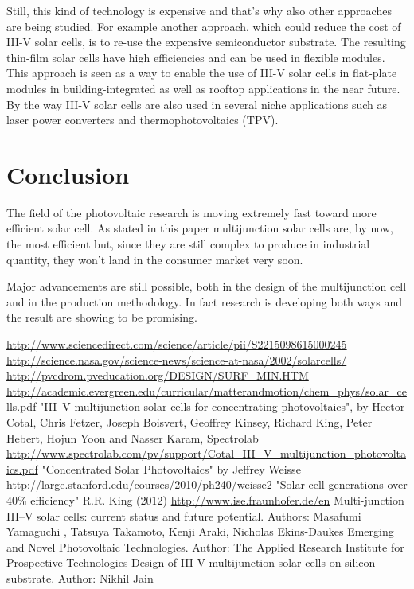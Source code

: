 \documentclass[11pt]{article} %
\begin{document}
Still, this kind of technology is expensive and that’s why also other approaches are being studied. For example another  approach, which  could  reduce  the cost  of  III-V  solar  cells,  is  to re-use  the  expensive semiconductor substrate. The resulting thin-film solar cells have high efficiencies and can be used in flexible modules. This approach is  seen  as  a  way  to  enable  the  use  of  III-V  solar  cells  in  flat-plate modules in building-integrated as well as rooftop applications in the near future. By the way III-V solar cells are also used in several niche applications such as laser power converters and thermophotovoltaics (TPV).
 

\section{Conclusion}

The field of the photovoltaic research is moving extremely fast toward more efficient solar cell. As stated in this paper multijunction solar cells are, by now, the most efficient but, since they are still complex to produce in industrial quantity, they won't land in the consumer market very soon.

Major advancements are still possible, both in the design of the multijunction cell and in the production methodology. In fact research is developing both ways and the result are showing to be promising.

\begin{thebibliography}{9}
\bibitem{}
\url{http://www.sciencedirect.com/science/article/pii/S2215098615000245}
\bibitem{}
\url{http://science.nasa.gov/science-news/science-at-nasa/2002/solarcells/}
\bibitem{}
\url{http://pvcdrom.pveducation.org/DESIGN/SURF_MIN.HTM}
\bibitem{}
\url{http://academic.evergreen.edu/curricular/matterandmotion/chem_phys/solar_cells.pdf}
\bibitem{}
	"III–V multijunction solar cells for concentrating photovoltaics", by Hector Cotal, Chris Fetzer, Joseph Boisvert, Geoffrey Kinsey, Richard King, Peter Hebert, Hojun Yoon and Nasser Karam, Spectrolab \url{http://www.spectrolab.com/pv/support/Cotal_III_V_multijunction_photovoltaics.pdf}
\bibitem{}
	"Concentrated Solar Photovoltaics" by Jeffrey Weisse \url{http://large.stanford.edu/courses/2010/ph240/weisse2}
\bibitem{}
	"Solar cell generations over 40\% efficiency" R.R. King (2012) 
\bibitem{}
	\url{http://www.ise.fraunhofer.de/en}
\bibitem{}
	Multi-junction III–V solar cells: current status and future potential. Authors: Masafumi Yamaguchi , Tatsuya Takamoto, Kenji Araki, Nicholas Ekins-Daukes 
\bibitem{}
	Emerging and Novel Photovoltaic Technologies. Author: The Applied Research Institute for Prospective Technologies  
\bibitem{}
	Design of III-V multijunction solar cells on silicon substrate. Author: Nikhil Jain 

\end{thebibliography}
\end{document}
